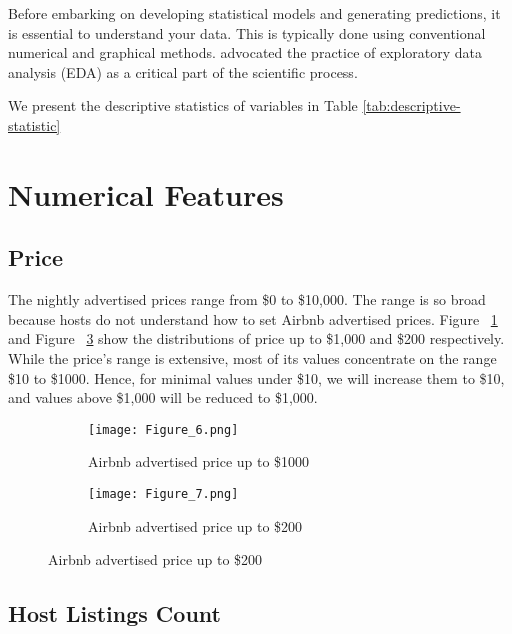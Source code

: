 
Before embarking on developing statistical models and generating predictions, it
is essential to understand your data. This is typically done using conventional
numerical and graphical methods. \textcite{tukey1977exploratory} advocated the practice
of exploratory data analysis (EDA) as a critical part of the scientific process.


We present the descriptive statistics of variables in Table
\ref{tab:descriptive-statistic}


\section{Numerical Features}
\label{sec:numerical_features}


\subsection{Price}

The nightly advertised prices range from \$0 to \$10,000. The range is so broad
because hosts do not understand how to set Airbnb advertised prices.  Figure
~\ref{fig:price-distribution-1000} and Figure ~\ref{fig:price-distribution-200}
 show the distributions of price up to \$1,000 and \$200 respectively. While the
price's range is extensive, most of its values concentrate on the range \$10 to
\$1000.  Hence, for minimal values under \$10, we will increase them to \$10,
and values above \$1,000 will be reduced to \$1,000.
\begin{figure}[H]
    \begin{center}

    \caption{Price Distribution}
    \begin{subfigure}[b]{0.48\textwidth}
        \centering
        \caption{Airbnb advertised price up to \$1000}
        \texttt{[image: Figure\_6.png]}
        \label{fig:price-distribution-1000}
    \end{subfigure}
    \begin{subfigure}[b]{0.48\textwidth}
        \centering
        \caption{Airbnb advertised price up to \$200}
        \texttt{[image: Figure\_7.png]}
        \label{fig:price-distribution-200}
    \end{subfigure}

    \end{center}
\end{figure}

\subsection{Host Listings Count}

